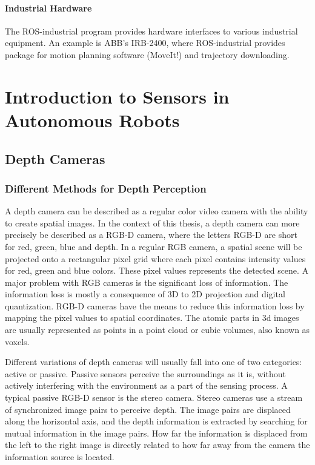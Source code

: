 \paragraph{Industrial Hardware}

The ROS-industrial program\cite{ROS_industrial} provides hardware interfaces to various industrial equipment. An example is ABB's IRB-2400, where \ac{ROS}-industrial provides package for motion planning software (MoveIt!) and trajectory downloading\cite{ROS_industria_hardware}. 

\section{Introduction to Sensors in Autonomous Robots}

\subsection{Depth Cameras}

\subsubsection{Different Methods for Depth Perception}

A depth camera can be described as a regular color video camera with the ability to create spatial images. In the context of this thesis, a depth camera can  more precisely be described as a RGB-D camera, where the letters RGB-D are short for red, green, blue and depth. In a regular RGB camera, a spatial scene will be projected onto a rectangular pixel grid where each pixel contains intensity values for red, green and blue colors. These pixel values represents the detected scene. A major problem with RGB cameras is the significant loss of information. The information loss is mostly a consequence of 3D to 2D projection and digital quantization. RGB-D cameras have the means to reduce this information loss by mapping the pixel values to spatial coordinates. The atomic parts in 3d images are usually represented as points in a point cloud or cubic volumes, also known as voxels.

Different variations of depth cameras will usually fall into one of two categories: active or passive. Passive sensors perceive the surroundings as it is, without actively interfering with the environment as a part of the sensing process. A typical passive RGB-D sensor is the stereo camera. Stereo cameras use a stream of synchronized image pairs to perceive depth. The image pairs are displaced along the horizontal axis, and the depth information is extracted by searching for mutual information in the image pairs. How far the information is displaced from the left to the right image is directly related to how far away from the camera the information source is located. 

